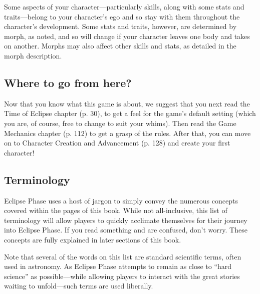 Some aspects of your character—particularly skills, along with some stats and traits—belong to your character's ego and so stay with them throughout the character's development. Some stats and traits, however, are determined by morph, as noted, and so will change if your character leaves one body and takes on another. Morphs may also affect other skills and stats, as detailed in the morph description. 



\subsection{Where to go from here?} \label{sec:where-go-from} 

Now that you know what this game is about, we suggest that you next read the Time of Eclipse chapter (p. 30), to get a feel for the game's default setting (which you are, of course, free to change to suit your whims). Then read the Game Mechanics chapter (p. 112) to get a grasp of the rules. After that, you can move on to Character Creation and Advancement (p. 128) and create your first character! 



\subsection{Terminology} \label{sec:terminology} 

Eclipse Phase uses a host of jargon to simply convey the numerous concepts covered within the pages of this book. While not all-inclusive, this list of terminology will allow players to quickly acclimate themselves for their journey into Eclipse Phase. If you read something and are confused, don't worry. These concepts are fully explained in later sections of this book. 

Note that several of the words on this list are standard scientific terms, often used in astronomy. As Eclipse Phase attempts to remain as close to ``hard science'' as possible—while allowing players to interact with the great stories waiting to unfold—such terms are used liberally. 

